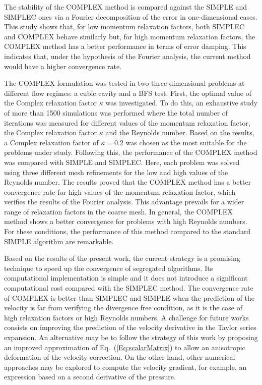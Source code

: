 \documentclass[final,3p,times,11pt,onecolumn]{myElsarticle}
\numberwithin{equation}{section}
\begin{document}
The stability of the COMPLEX method is compared against the SIMPLE and SIMPLEC ones via a Fourier decomposition of the error in one-dimensional cases. This study shows that, for low momentum relaxation factors, both SIMPLEC and COMPLEX behave similarly but, for high momentum relaxation factors, the COMPLEX method has a better performance in terms of error damping. This indicates that, under the hypothesis of the Fourier analysis, the current method would have a higher convergence rate.

The COMPLEX formulation was tested in two three-dimensional problems at different flow regimes: a cubic cavity and a BFS test. First, the optimal value of the Complex relaxation factor $\kappa$ was investigated. To do this, an exhaustive study of more than 1500 simulations was performed where the total number of iterations was measured for different values of the momentum relaxation factor, the Complex relaxation factor $\kappa$ and the Reynolds number. Based on the results, a Complex relaxation factor of $\kappa = 0.2$ was chosen as the most suitable for the problems under study. Following this, the performance of the COMPLEX method was compared with SIMPLE and SIMPLEC. Here, each problem was solved using three different mesh refinements for the low and high values of the Reynolds number. The results proved that the COMPLEX method has a better convergence rate for high values of the momentum relaxation factor, which verifies the results of the Fourier analysis. This advantage prevails for a wider range of relaxation factors in the coarse mesh. In general, the COMPLEX method shows a better convergence for problems with high Reynolds numbers. For these conditions, the performance of this method compared to the standard SIMPLE algorithm are remarkable.

Based on the results of the present work, the current strategy is a promising technique to speed up the convergence of segregated algorithms. Its computational implementation is simple and it does not introduce a significant computational cost compared with the SIMPLEC method. The convergence rate of COMPLEX is better than SIMPLEC and SIMPLE when the prediction of the velocity is far from verifying the divergence free condition, as it is the case of high relaxation factors or high Reynolds numbers. 
A challenge for future works consists on improving the prediction of the velocity derivative in the Taylor series expansion. An alternative may be to follow the strategy of this work by proposing an improved  approximation of Eq.~(\ref{Eq:scalarMatrix}) to allow an anisotropic deformation of the velocity correction. On the other hand, other numerical approaches may be explored to compute the velocity gradient, for example, an expression based on a second derivative of the pressure. 



\end{document}
